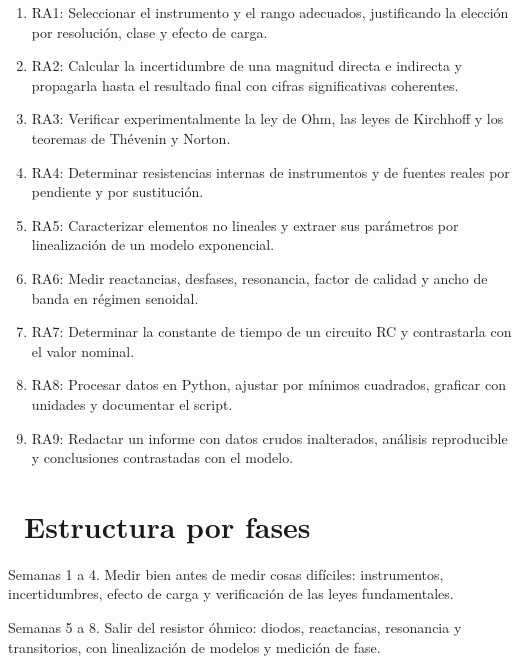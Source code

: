 \documentclass[11pt,a4paper]{article}
\newcommand{\iconotexto}[2]{\textcolor{cyanNeon}{\faIcon{#1}}~#2}
\begin{document}
\begin{enumerate}[leftmargin=1.4em,itemsep=2pt,topsep=3pt]
  \item RA1: Seleccionar el instrumento y el rango adecuados, justificando la elección por resolución, clase y efecto de carga.
  \item RA2: Calcular la incertidumbre de una magnitud directa e indirecta y propagarla hasta el resultado final con cifras significativas coherentes.
  \item RA3: Verificar experimentalmente la ley de Ohm, las leyes de Kirchhoff y los teoremas de Thévenin y Norton.
  \item RA4: Determinar resistencias internas de instrumentos y de fuentes reales por pendiente y por sustitución.
  \item RA5: Caracterizar elementos no lineales y extraer sus parámetros por linealización de un modelo exponencial.
  \item RA6: Medir reactancias, desfases, resonancia, factor de calidad y ancho de banda en régimen senoidal.
  \item RA7: Determinar la constante de tiempo de un circuito RC y contrastarla con el valor nominal.
  \item RA8: Procesar datos en Python, ajustar por mínimos cuadrados, graficar con unidades y documentar el script.
  \item RA9: Redactar un informe con datos crudos inalterados, análisis reproducible y conclusiones contrastadas con el modelo.
\end{enumerate}

\section{\iconotexto{sitemap}{Estructura por fases}}

\begin{tcolorbox}[cajaContenido,title={Fase 1 --- Instrumentación y leyes básicas de los circuitos}]Semanas 1 a 4. Medir bien antes de medir cosas difíciles: instrumentos, incertidumbres, efecto de carga y verificación de las leyes fundamentales.
\end{tcolorbox}

\begin{tcolorbox}[cajaContenido,title={Fase 2 --- Elementos no lineales y régimen senoidal}]Semanas 5 a 8. Salir del resistor óhmico: diodos, reactancias, resonancia y transitorios, con linealización de modelos y medición de fase.
\end{tcolorbox}
\end{document}
